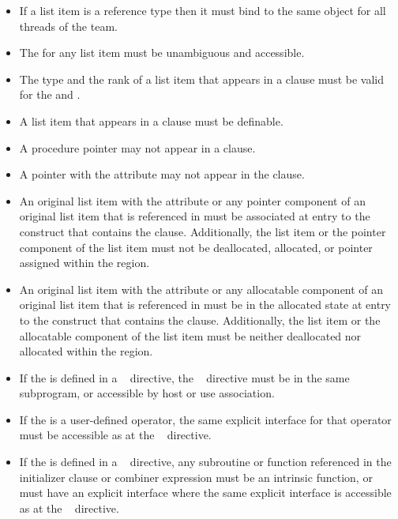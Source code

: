 \begin{itemize}
\item If a list item is a reference type then it must bind to the same object for all threads of 
the team.

\item The  for any list item must be unambiguous and accessible.
\ccppspecificend
\bigskip

\fortranspecificstart
\item The type and the rank of a list item that appears in a  clause must be valid for the  and .

\item A list item that appears in a  clause must be definable.

\item A procedure pointer may not appear in a  clause.

\item A pointer with the  attribute may not appear in the  
clause. 

\item An original list item with the  attribute or any
  pointer component of an original list item that is referenced in
   must be associated at entry to the construct that
  contains the  clause. Additionally, the list item or
  the pointer component of the list item must not be deallocated,
  allocated, or pointer assigned within the region.

\item An original list item with the  attribute or
  any allocatable component of an original list item that is
  referenced in  must be in the allocated state at entry
  to the construct that contains the 
  clause. Additionally, the list item or the allocatable component of
  the list item must be neither deallocated nor allocated within the
  region.

\item If the  is defined in a ~ directive, the 
~ directive must be in the same subprogram, or accessible by 
host or use association.

\item If the  is a user-defined operator, the same explicit interface for 
that operator must be accessible as at the ~ directive.

\item If the  is defined in a ~ directive, any 
subroutine or function referenced in the initializer clause or combiner expression 
must be an intrinsic function, or must have an explicit interface where the same 
explicit interface is accessible as at the ~ directive.
\fortranspecificend
\end{itemize}










